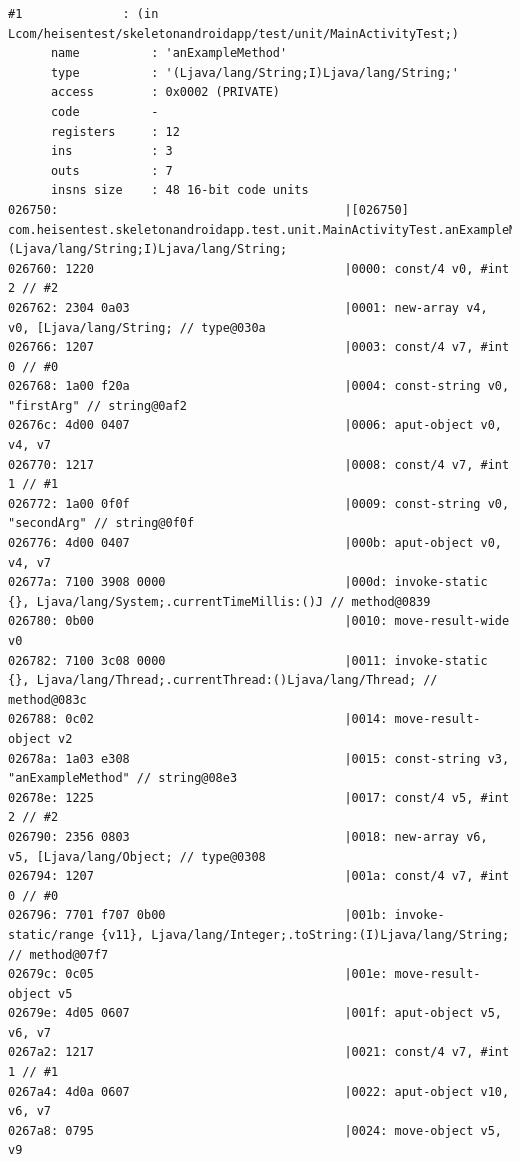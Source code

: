 \begin{lstlisting}[label=instrumented_example]
    #1              : (in Lcom/heisentest/skeletonandroidapp/test/unit/MainActivityTest;)
      name          : 'anExampleMethod'
      type          : '(Ljava/lang/String;I)Ljava/lang/String;'
      access        : 0x0002 (PRIVATE)
      code          -
      registers     : 12
      ins           : 3
      outs          : 7
      insns size    : 48 16-bit code units
026750:                                        |[026750] com.heisentest.skeletonandroidapp.test.unit.MainActivityTest.anExampleMethod:(Ljava/lang/String;I)Ljava/lang/String;
026760: 1220                                   |0000: const/4 v0, #int 2 // #2
026762: 2304 0a03                              |0001: new-array v4, v0, [Ljava/lang/String; // type@030a
026766: 1207                                   |0003: const/4 v7, #int 0 // #0
026768: 1a00 f20a                              |0004: const-string v0, "firstArg" // string@0af2
02676c: 4d00 0407                              |0006: aput-object v0, v4, v7
026770: 1217                                   |0008: const/4 v7, #int 1 // #1
026772: 1a00 0f0f                              |0009: const-string v0, "secondArg" // string@0f0f
026776: 4d00 0407                              |000b: aput-object v0, v4, v7
02677a: 7100 3908 0000                         |000d: invoke-static {}, Ljava/lang/System;.currentTimeMillis:()J // method@0839
026780: 0b00                                   |0010: move-result-wide v0
026782: 7100 3c08 0000                         |0011: invoke-static {}, Ljava/lang/Thread;.currentThread:()Ljava/lang/Thread; // method@083c
026788: 0c02                                   |0014: move-result-object v2
02678a: 1a03 e308                              |0015: const-string v3, "anExampleMethod" // string@08e3
02678e: 1225                                   |0017: const/4 v5, #int 2 // #2
026790: 2356 0803                              |0018: new-array v6, v5, [Ljava/lang/Object; // type@0308
026794: 1207                                   |001a: const/4 v7, #int 0 // #0
026796: 7701 f707 0b00                         |001b: invoke-static/range {v11}, Ljava/lang/Integer;.toString:(I)Ljava/lang/String; // method@07f7
02679c: 0c05                                   |001e: move-result-object v5
02679e: 4d05 0607                              |001f: aput-object v5, v6, v7
0267a2: 1217                                   |0021: const/4 v7, #int 1 // #1
0267a4: 4d0a 0607                              |0022: aput-object v10, v6, v7
0267a8: 0795                                   |0024: move-object v5, v9

\end{lstlisting}
